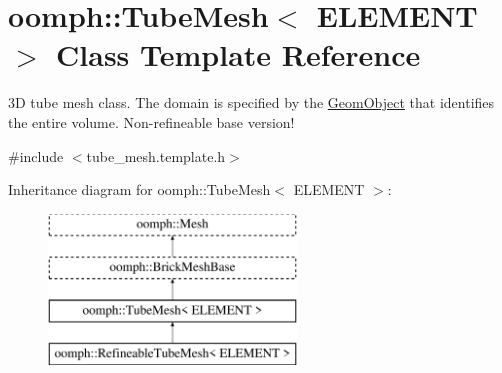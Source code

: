 \hypertarget{classoomph_1_1TubeMesh}{}\section{oomph\+:\+:Tube\+Mesh$<$ E\+L\+E\+M\+E\+NT $>$ Class Template Reference}
\label{classoomph_1_1TubeMesh}


3D tube mesh class. The domain is specified by the \hyperlink{classoomph_1_1GeomObject}{Geom\+Object} that identifies the entire volume. Non-\/refineable base version!  




{\ttfamily \#include $<$tube\+\_\+mesh.\+template.\+h$>$}

Inheritance diagram for oomph\+:\+:Tube\+Mesh$<$ E\+L\+E\+M\+E\+NT $>$\+:\begin{figure}[H]
\begin{center}
\leavevmode
\includegraphics[height=4.000000cm]{classoomph_1_1TubeMesh}
\end{center}
\end{figure}
